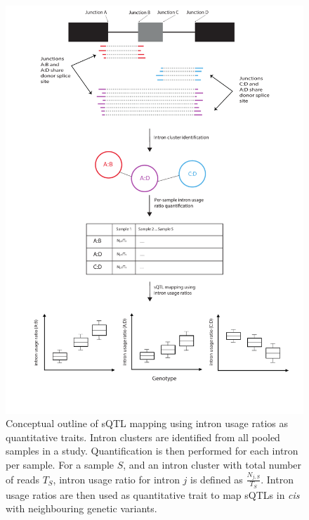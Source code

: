 \begin{figure}[H]
    \centering
    \includegraphics[width=\textwidth]{leafcutter_conceptual}
    \caption{Conceptual outline of sQTL mapping using intron usage ratios as quantitative traits. Intron clusters are identified from all pooled samples in a study. Quantification is then performed for each intron per sample. For a sample $S$, and an intron cluster with total number of reads $T_{S}$, intron usage ratio for intron $j$ is defined as $\frac{N_{j,S}}{T_{S}}$. Intron usage ratios are then used as quantitative trait to map sQTLs in \textit{cis} with neighbouring genetic variants.}
    \label{fig:leafcutter_conceptual}   
  \end{figure}

